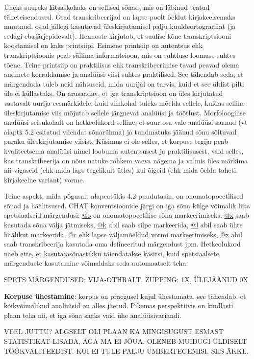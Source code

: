 \documentclass[12pt]{article}
\begin{document}
Üheks suureks kitsaskohaks on sellised sõnad, mis on läbinud teatud täheteisendused. Osad transkribeerijad on lapse poolt öeldut kirjakeelsemaks muutnud, osad jällegi kasutavad üleskirjutamisel palju kuuldeortograafiat (ja sedagi ebajärjepidevalt). Hennoste kirjutab, et suulise kõne transkriptsiooni koostamisel on kaks printsiipi. Esimene printsiip on autentsus ehk transkriptsioonis peab säilima informatsioon, mis on suhtluse loomuse suhtes tõene. Teine printsiip on praktilisus ehk transkribeerimise tavad peavad olema andmete korraldamise ja analüüsi viisi suhtes praktilised. See tähendab seda, et märgendada tuleb neid nähtuseid, mida uurijal on tarvis, kuid et see üldist pilti üle ei küllastaks. \citep[92--93]{Hennoste} On arusaadav, et iga transkriptsioon on üles kirjutatud vastavalt uurija eesmärkidele, kuid siinkohal tuleks mõelda sellele, kuidas selline üleskirjutamise viis mõjutab sellele järgnevat analüüsi ja töötlust. Morfoloogilise analüüsi seisukohalt on hetkeolukord selline, et suur osa vale analüüsi saanud (vt alaptk 5.2 esitatud viiendat sõnarühma) ja tundmatuks jäänud sõnu sõltuvad paraku üleskirjutamise viisist. Küsimus ei ole selles, et korpuse tegija peab kvaliteetsema analüüsi nimel loobuma autentsusest ja praktilisusest, vaid selles, kas transkribeerija on nõus natuke rohkem vaeva nägema ja valmis üles märkima nii vigaseid (ehk mida laps tegelikult ütles) kui õigeid (ehk mida öelda taheti, kirjakeelne variant) vorme.

Teine aspekt, mida põgusalt alapeatükis 4.2 puudutasin, on onomatopoeetilised sõnad ja häälitsused. CHAT konventsioonide järgi on iga sõna külge võimalik liita spetsiaalseid märgendusi: \underline{@o} on onomatopoeetilise sõna markeerimiseks, \underline{@x} saab kasutada sõna välja jätmiseks, \underline{@k} abil saab silpe markeerida, \underline{@l} abil saab ühte häälikut markeerida, \underline{@c} ehk lapse väljamõeldud vormi markeerimiseks, \underline{@z} abil saab transkribeerija kasutada oma defineeritud märgendust jpm. Hetkeolukord näeb ette, et kasutajasõnastikku täiendatakse käsitsi, kuid spetsiaalsete märgenduste kasutamine võimaldaks seda automaatselt teha.

SPETS MÄRGENDUSED: VIJA-OTHRALT, ZUPPING: 1X, ÜLEJÄÄNUD 0X

\textbf{Korpuse ühestamine}: korpus on praegusel kujul ühestamata, see tähendab, et kõikvõimalikud analüüsid on alles jäetud. Pikemas perspektiivis on kindlasti plaan teha nii, et iga sõna saaks vaid ühe analüüsivariandi.

VEEL JUTTU? ALGSELT OLI PLAAN KA MINGISUGUST ESMAST STATISTIKAT LISADA, AGA MA EI JÕUA. OLENEB MUIDUGI ÜLDISELT TÖÖKVALITEEDIST. KUI EI TULE PALJU ÜMBERTEGEMISI, SIIS ÄKKI..
\end{document}
